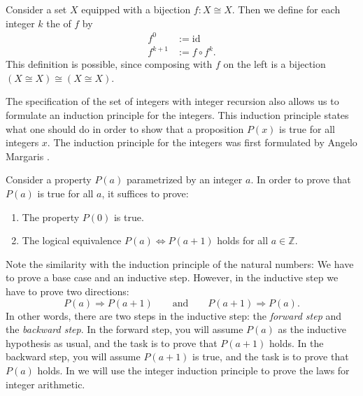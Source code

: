 \begin{definition}
  Consider a set $X$ equipped with a bijection $f:X\cong X$. Then we define for each integer $k$ the  of $f$ by
  \begin{align*}
    f^{0} & := \mathrm{id} \\
    f^{k+1} & := f\circ f^k.
  \end{align*}
  This definition is possible, since composing with $f$ on the left is a bijection $(X\cong X)\cong(X\cong X)$.
\end{definition}

The specification of the set of integers with integer recursion also allows us to formulate an induction principle for the integers. This induction principle states what one should do in order to show that a proposition $P(x)$ is true for all integers $x$. The induction principle for the integers was first formulated by Angelo Margaris \cite{margaris1961}.

\begin{theorem}\label{theorem:integer-induction}
  Consider a property $P(a)$ parametrized by an integer $a$. In order to prove that $P(a)$ is true for all $a$, it suffices to prove:
  \begin{enumerate}
  \item The property $P(0)$ is true.
  \item The logical equivalence $P(a)\Leftrightarrow P(a+1)$ holds for all $a\in\mathbb{Z}$. 
  \end{enumerate}
\end{theorem}

Note the similarity with the induction principle of the natural numbers: We have to prove a base case and an inductive step. However, in the inductive step we have to prove two directions:
\begin{equation*}
  P(a) \Rightarrow P(a+1)\qquad\text{and}\qquad P(a+1)\Rightarrow P(a).
\end{equation*}
In other words, there are two steps in the inductive step: the \emph{forward step} and the \emph{backward step}. In the forward step, you will assume $P(a)$ as the inductive hypothesis as usual, and the task is to prove that $P(a+1)$ holds. In the backward step, you will assume $P(a+1)$ is true, and the task is to prove that $P(a)$ holds.
In  we will use the integer induction principle to prove the laws for integer arithmetic.

